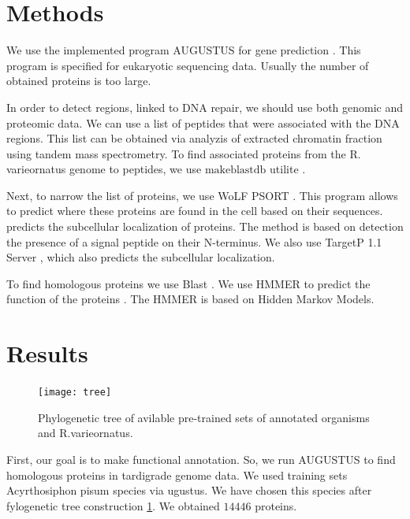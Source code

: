 \documentclass{article}
\begin{document}
 
 
 

\section{Methods}
 We use the implemented program AUGUSTUS for gene prediction \cite{augustus}. This program is specified for eukaryotic sequencing data. Usually the number of obtained proteins is too large. 
 
 In order to detect regions, linked to DNA repair, we should use both genomic and proteomic data. We can use a list of peptides that were associated with the DNA regions. This list can be obtained via analyzis of extracted chromatin fraction using tandem mass spectrometry. To find associated proteins from the R. varieornatus genome  to peptides, we use $\textrm{makeblastdb}$ utilite \cite{blast}.
 
 Next, to narrow the list of proteins, we use WoLF PSORT \cite{WOlf}. This program allows to predict where these proteins are found in the cell based on their sequences. predicts the subcellular localization of proteins. The method is based on detection the presence of a signal peptide on their N-terminus. We also use TargetP 1.1 Server \cite{ptarget}, which also predicts the subcellular localization.
 
 To find homologous proteins we use Blast \cite{2}. We use HMMER to predict the function of the proteins \cite{HMM}. The HMMER is based on Hidden Markov Models.  
 

\section{Results}
 \begin{figure}[h]
 	\centering
 	\texttt{[image: tree]}  
 	\caption{ Phylogenetic tree of avilable pre-trained sets of annotated organisms and R.varieornatus.}
 	\label{tree}
 \end{figure}
  First, our goal is to make functional annotation. So, we run AUGUSTUS to find homologous proteins in tardigrade genome data. We used training sets  Acyrthosiphon pisum species via ugustus. We have chosen this species after  fylogenetic tree construction \ref{tree}.   We obtained $14446$ proteins. 
 
\end{document}
